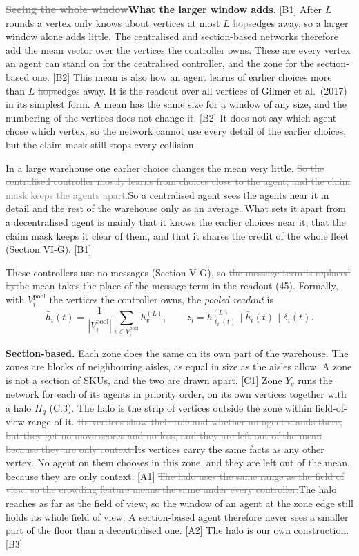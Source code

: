 \documentclass[11pt,a4paper]{article}
\newcommand{\new}[1]{\textcolor{newc}{#1}}
\newcommand{\old}[1]{\textcolor{gray}{\sout{#1}}}
\begin{document}
\textbf{\old{Seeing the whole window}\new{What the larger window adds}.}
[B1] After $L$ rounds a vertex only knows about vertices \new{at most} $L$
\old{hops}\new{edges} away, so a larger window alone adds little. The
centralised and section-based networks therefore add the mean vector over
the vertices the controller owns. \new{These are every vertex an agent can
stand on for the centralised controller, and the zone for the
section-based one.} [B2] This mean is also how an agent learns of earlier
choices more than $L$ \old{hops}\new{edges} away. \new{It is the readout
over all vertices of Gilmer et al.\ (2017) in its simplest form. A mean has
the same size for a window of any size, and the numbering of the vertices
does not change it.} [B2] It does not say which agent chose which vertex,
so the network cannot use every detail of the earlier choices, but the
claim mask still stops every collision.

In a large warehouse one earlier choice changes the mean very little.
\old{So the centralised controller mostly learns from choices close to the
agent, and the claim mask keeps the agents apart.}\new{So a centralised
agent sees the agents near it in detail and the rest of the warehouse only
as an average. What sets it apart from a decentralised agent is mainly that
it knows the earlier choices near it, that the claim mask keeps it clear of
them, and that it shares the credit of the whole fleet
(Section VI-G).} [B1]

These controllers use no messages (Section V-G), so \old{the message term
is replaced by}\new{the mean takes the place of the message term in} \new{the
readout (45)}. Formally, with $V_i^{\mathrm{pool}}$ the vertices the
controller owns, the \emph{pooled readout} is
\begin{equation*}
  \bar h_i(t) = \frac{1}{|V_i^{\mathrm{pool}}|}
    \sum_{v \in V_i^{\mathrm{pool}}} h_v^{(L)}, \qquad
  z_i = h_{\ell_i(t)}^{(L)} \;\Vert\; \bar h_i(t) \;\Vert\; \delta_i(t) .
  \tag{47}
\end{equation*}

\textbf{Section-based.} Each zone does the same on its own part of the
warehouse. \new{The zones are blocks of neighbouring aisles, as equal in
size as the aisles allow. A zone is not a section of SKUs, and the two are
drawn apart.} [C1] Zone $Y_q$ runs the network for each of its agents in
priority order, on its own vertices together with a halo $H_q$ (C.3). The
halo is the strip of vertices outside the zone within field-of-view range
of it. \old{Its vertices show their role and whether an agent stands there,
but they get no move scores and no loss, and they are left out of the mean
because they are only context.}\new{Its vertices carry the same facts as any
other vertex. No agent on them chooses in this zone, and they are left out
of the mean, because they are only context.} [A1] \old{The halo uses the
same range as the field of view, so the crowding feature means the same
under every controller.}\new{The halo reaches as far as the field of view,
so the window of an agent at the zone edge still holds its whole field of
view. A section-based agent therefore never sees a smaller part of the floor
than a decentralised one.} [A2] \new{The halo is our own construction.}
[B3]
\end{document}
